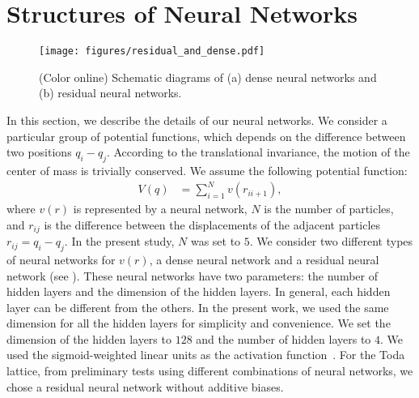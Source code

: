 \section{Structures of Neural Networks}
\begin{figure}[t]
  \centering
  \texttt{[image: figures/residual\_and\_dense.pdf]}
  \caption{
    (Color online) Schematic diagrams of (a) dense neural networks and (b) residual neural networks.
    }
  \label{fig:residual_and_dense}
\end{figure}
In this section, we describe the details of our neural networks.
We consider a particular group of potential functions, which depends on the difference between two positions $q_i - q_j$.
According to the translational invariance, the motion of the center of mass is trivially conserved.
We assume the following potential function:
\begin{align}
    V(q) & = \sum_{i=1}^{N}v(r_{ii+1}),
\end{align}
where $v(r)$ is represented by a neural network, $N$ is the number of particles, and $r_{ij}$ is the difference between the displacements of the adjacent particles $r_{ij} = q_i - q_j$.
In the present study, $N$ was set to $5$.
We consider two different types of neural networks for $v(r)$, a dense neural network and a residual neural network (see ).
These neural networks have two parameters: the number of hidden layers and the dimension of the hidden layers.
In general, each hidden layer can be different from the others.
In the present work, we used the same dimension for all the hidden layers for simplicity and convenience.
We set the dimension of the hidden layers to $128$ and the number of hidden layers to $4$.
We used the sigmoid-weighted linear units as the activation function~\cite{Elfwing-Uchibe-Doya2018}.
For the Toda lattice, from preliminary tests using different combinations of neural networks, we chose a residual neural network without additive biases.

